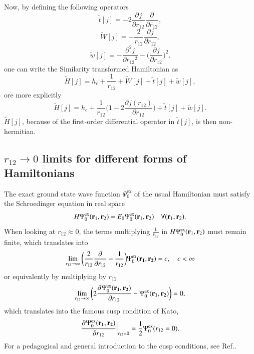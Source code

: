 \documentclass[aip,jcp,reprint,noshowkeys,superscriptaddress]{revtex4-1}
\newcommand{\deriv}[3]{\frac{\partial^{#3} #1}{\partial {#2}^{#3}}}
\newcommand{\bd}[1]{{\bf {#1}}}
\newcommand{\br}[0]{{\bf {r}}}
\newcommand{\psiex}[0]{\Psi^{\text{ex}}_0}
\begin{document}
Now, by defining the following operators 
\begin{equation}
 \label{eq:def_tt}
 \tilde{t}[j] = -2 \deriv{j}{r_{12}}{} \deriv{}{r_{12}}{},
\end{equation}
\begin{equation}
 \label{eq:def_wt}
 \tilde{W}[j] = -\frac{2}{r_{12}} \deriv{j}{r_{12}}{}  , 
\end{equation}
\begin{equation}
 \label{eq:def_wt}
 \tilde{w}[j] = -\deriv{j}{r_{12}}{2} - \bigg( \deriv{j}{r_{12}}{} \bigg)^2. 
\end{equation}
one can write the Similarity transformed Hamiltonian  as
\begin{equation}
 \label{eq:ht_phi}
 \tilde{H}[j] = h_c + \frac{1}{r_{12}}  + \tilde{W}[j] + \tilde{t}[j] + \tilde{w}[j] ,
\end{equation}
ore more explicitly 
\begin{equation}
 \tilde{H}[j] = h_c + \frac{1}{r_{12}}\bigg( 1 - 2 \deriv{j(r_{12})}{r_{12}}{}\bigg) + \tilde{t}[j] + \tilde{w}[j] .
\end{equation}
$\tilde{H}[j]$, because of the first-order differential operator in $\tilde{t}[j]$, is then non-hermitian.  

\subsection{$r_{12} \rightarrow 0$ limits for different forms of Hamiltonians}
\label{sec:cusp}
The exact ground state wave function $\psiex$ of the usual Hamiltonian must satisfy the Schroedinger equation in real space 
\begin{equation}
 H \psiex(\br{}_1,\br{}_2) = E_0 \psiex(\br{}_1,\br{}_2)\quad \forall (\br{}_1,\br{}_2).
\end{equation}
When looking at $r_{12}\approx 0$, the terms multiplying $\frac{1}{r_{12}}$ in $H \psiex(\br{}_1,\br{}_2)$ must remain finite, which translates into
\begin{equation}
 \label{eq:cusp_0}
 \lim_{r_{12}\rightarrow \infty}\bigg( \frac{2}{r_{12}} \deriv{}{r_{12}}{} -\frac{1}{r_{12}}\bigg) \psiex(\bd{r_1},\bd{r_2})  = c,\quad c<\infty 
\end{equation}
or equivalently by multiplying by $r_{12}$
\begin{equation}
 \lim_{r_{12}\rightarrow \infty}\bigg( 2 \deriv{\psiex(\bd{r_1},\bd{r_2})}{r_{12}}{} -\psiex(\bd{r_1},\bd{r_2}) \bigg) = 0, 
\end{equation}
which translates into the famous cusp condition of Kato\cite{Kat-CPAM-57}, 
\begin{equation}
 \deriv{\psiex(\bd{r_1},\bd{r_2})}{r_{12}}{}\Bigr|_{r_{12}=0} = \frac{1}{2} \psiex(r_{12}=0). 
\end{equation} 
For a pedagogical and general introduction to the cusp conditions, see Ref.. 
\end{document}
